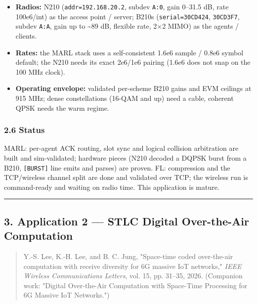 \documentclass[
  10pt,
]{article}
\providecommand{\tightlist}{%
  \setlength{\itemsep}{0pt}\setlength{\parskip}{0pt}}
\begin{document}
\begin{itemize}
\tightlist
\item
  \textbf{Radios:} N210 (\texttt{addr=192.168.20.2}, subdev
  \texttt{A:0}, gain 0--31.5 dB, rate 100e6/int) as the access point /
  server; B210s (\texttt{serial=30CD424}, \texttt{30CD3F7}, subdev
  \texttt{A:A}, gain up to \textasciitilde89 dB, flexible rate, 2×2
  MIMO) as the agents / clients.
\item
  \textbf{Rates:} the MARL stack uses a self-consistent 1.6e6 sample /
  0.8e6 symbol default; the N210 needs its exact 2e6/1e6 pairing (1.6e6
  does not snap on the 100 MHz clock).
\item
  \textbf{Operating envelope:} validated per-scheme B210 gains and EVM
  ceilings at 915 MHz; dense constellations (16-QAM and up) need a
  cable, coherent QPSK needs the warm regime.
\end{itemize}

\hypertarget{26-status}{%
\subsubsection{2.6 Status}\label{26-status}}

MARL: per-agent ACK routing, slot sync and logical collision arbitration
are built and sim-validated; hardware pieces (N210 decoded a DQPSK burst
from a B210, \texttt{{[}BURST{]}} line emits and parses) are proven. FL:
compression and the TCP/wireless channel split are done and validated
over TCP; the wireless run is command-ready and waiting on radio time.
This application is mature.

\begin{center}\rule{0.5\linewidth}{0.5pt}\end{center}

\hypertarget{3-application-2--stlc-digital-over-the-air-computation}{%
\subsection{3. Application 2 --- STLC Digital Over-the-Air
Computation}\label{3-application-2--stlc-digital-over-the-air-computation}}

\begin{quote}
Y.-S. Lee, K.-H. Lee, and B. C. Jung, "Space-time coded over-the-air
computation with receive diversity for 6G massive IoT networks,"
\emph{IEEE Wireless Communications Letters}, vol. 15, pp. 31--35, 2026.
(Companion work: "Digital Over-the-Air Computation with Space-Time
Processing for 6G Massive IoT Networks.")
\end{quote}
\end{document}
